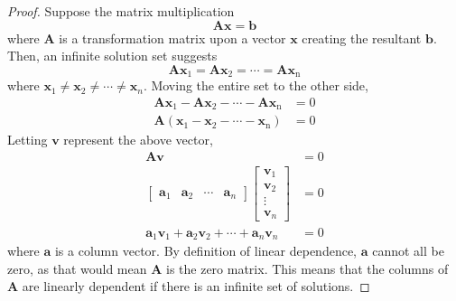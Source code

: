 \documentclass[]{article}
\begin{document}
\begin{proof}
Suppose the matrix multiplication
\begin{equation}
	\mathbf{Ax = b}
\end{equation}
where \(\mathbf{A}\) is a transformation matrix upon a vector \(\mathbf{x}\) creating the resultant \(\mathbf{b}\). Then, an infinite solution set suggests
\begin{equation}
	\mathbf{Ax_\mathrm{1} = Ax_\mathrm{2} = \cdots = Ax_\mathrm{n}}
\end{equation}
where \(\mathbf{x}_1 \neq \mathbf{x}_2 \neq \cdots \neq \mathbf{x}_n\). Moving the entire set to the other side,
\begin{align}
	\mathbf{Ax_\mathrm{1} - Ax_\mathrm{2} - \cdots - Ax_\mathrm{n}} &= 0 \\
	\mathbf{A(x_\mathrm{1} - x_\mathrm{2} - \cdots - x_\mathrm{n})} &= 0
\end{align}
Letting \(\mathbf{v}\) represent the above vector, 
\begin{align}
	\mathbf{Av} &= 0 \\
	\begin{bmatrix}
	\mathbf{a}_1 & \mathbf{a}_2 & \cdots & \mathbf{a}_n
	\end{bmatrix}
	\begin{bmatrix}
	\mathbf{v}_1 \\
	\mathbf{v}_2 \\
	\vdots \\
	\mathbf{v}_n
	\end{bmatrix} &= 0 \\
	\mathbf{a}_1 \mathbf{v}_1 + \mathbf{a}_2 \mathbf{v}_2 + \cdots + \mathbf{a}_n \mathbf{v}_n &= 0
\end{align}
where \(\mathbf{a}\) is a column vector. By definition of linear dependence, \(\mathbf{a}\) cannot all be zero, as that would mean \(\mathbf{A}\) is the zero matrix. This means that the columns of \(\mathbf{A}\) are linearly dependent if there is an infinite set of solutions. 
\end{proof}

\subsection{}
\end{document}
